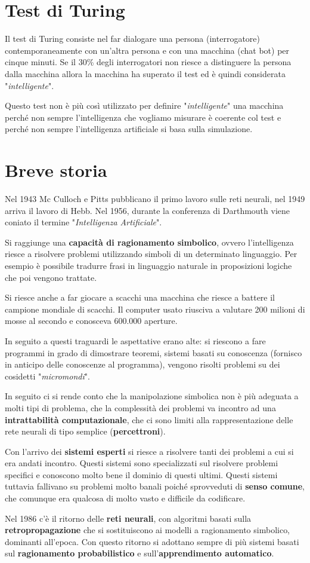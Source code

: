 \section{Test di Turing}
Il test di Turing consiste nel far dialogare una persona (interrogatore)
contemporaneamente con un'altra persona e con una macchina (chat bot) per cinque
minuti. Se il 30\% degli interrogatori non riesce a distinguere la persona dalla
macchina allora la macchina ha superato il test ed \`e quindi considerata
"\emph{intelligente}".

Questo test non \`e pi\`u cos\`i utilizzato per definire "\emph{intelligente}" una
macchina perch\'e non sempre l'intelligenza che vogliamo misurare \`e coerente col
test e perch\'e non sempre l'intelligenza artificiale si basa sulla simulazione.

\section{Breve storia}
Nel 1943 Mc Culloch e Pitts pubblicano il primo lavoro sulle reti neurali, nel 1949 arriva
il lavoro di Hebb. Nel 1956, durante la conferenza di Darthmouth viene coniato il termine
"\emph{Intelligenza Artificiale}".

Si raggiunge una \textbf{capacit\`a di ragionamento simbolico}, ovvero l'intelligenza riesce a
risolvere problemi utilizzando simboli di un determinato linguaggio. Per esempio \`e possibile
tradurre frasi in linguaggio naturale in proposizioni logiche che poi vengono trattate.

Si riesce anche a far giocare a scacchi una macchina che riesce a battere il campione mondiale
di scacchi. Il computer usato riusciva a valutare 200 milioni di mosse al secondo e conosceva
600.000 aperture.

In seguito a questi traguardi le aspettative erano alte: si riescono a fare programmi in grado
di dimostrare teoremi, sistemi basati su conoscenza (fornisco in anticipo delle conoscenze al
programma), vengono risolti problemi su dei cosidetti "\emph{micromondi}".

In seguito ci si rende conto che la manipolazione simbolica non \`e pi\`u adeguata a molti tipi
di problema, che la complessit\`a dei problemi va incontro ad una
\textbf{intrattabilit\`a computazionale}, che ci sono limiti alla rappresentazione delle rete
neurali di tipo semplice (\textbf{percettroni}).

Con l'arrivo dei \textbf{sistemi esperti} si riesce a risolvere tanti dei problemi a cui si era
andati incontro. Questi sistemi sono specializzati sul risolvere problemi specifici e conoscono
molto bene il dominio di questi ultimi. Questi sistemi tuttavia fallivano su problemi molto
banali poich\'e sprovveduti di \textbf{senso comune}, che comunque era qualcosa di molto
vasto e difficile da codificare.

Nel 1986 c'\`e il ritorno delle \textbf{reti neurali}, con algoritmi basati sulla
\textbf{retropropagazione} che si sostituiscono ai modelli a ragionamento simbolico,
dominanti all'epoca. Con questo ritorno si adottano sempre di pi\`u sistemi basati sul
\textbf{ragionamento probabilistico} e sull'\textbf{apprendimento automatico}.
